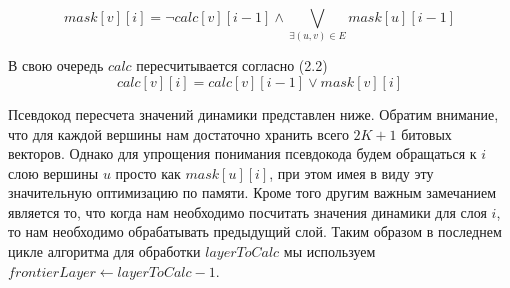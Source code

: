 
\FloatBarrier
\begin{equation}
mask[v][i] = \neg calc[v][i - 1] \wedge \bigvee_{\exists (u, v) \in E} mask[u][i - 1] 
\end{equation}
\FloatBarrier

В свою очередь $calc$ пересчитывается согласно (2.2)
\FloatBarrier
\begin{equation}
calc[v][i] = calc[v][i - 1] \vee mask[v][i]
\end{equation}
\FloatBarrier

Псевдокод пересчета значений динамики представлен ниже. Обратим внимание, что для каждой вершины нам достаточно хранить всего $2K + 1$ битовых векторов. Однако для упрощения понимания псевдокода будем обращаться к $i$ слою вершины $u$ просто как $mask[u][i]$, при этом имея в виду эту значительную оптимизацию по памяти. Кроме того другим важным замечанием является то, что когда нам необходимо посчитать значения динамики для слоя $i$, то нам необходимо обрабатывать предыдущий слой. Таким образом в последнем цикле алгоритма для обработки $layerToCalc$ мы используем $frontierLayer \gets layerToCalc - 1$.

